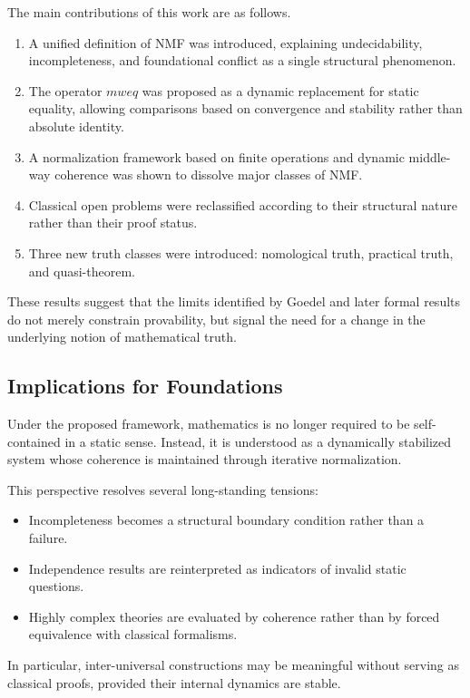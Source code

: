 \documentclass[11pt]{article}
\begin{document}
The main contributions of this work are as follows.

\begin{enumerate}
  \item A unified definition of NMF was introduced, explaining
  undecidability, incompleteness, and foundational conflict as a single
  structural phenomenon.
  \item The operator $mweq$ was proposed as a dynamic replacement for
  static equality, allowing comparisons based on convergence and
  stability rather than absolute identity.
  \item A normalization framework based on finite operations and
  dynamic middle-way coherence was shown to dissolve major classes of
  NMF.
  \item Classical open problems were reclassified according to their
  structural nature rather than their proof status.
  \item Three new truth classes were introduced: nomological truth,
  practical truth, and quasi-theorem.
\end{enumerate}

These results suggest that the limits identified by Goedel and later
formal results do not merely constrain provability, but signal the need
for a change in the underlying notion of mathematical truth.

\subsection{Implications for Foundations}

Under the proposed framework, mathematics is no longer required to be
self-contained in a static sense.
Instead, it is understood as a dynamically stabilized system whose
coherence is maintained through iterative normalization.

This perspective resolves several long-standing tensions:

\begin{itemize}
  \item Incompleteness becomes a structural boundary condition rather
  than a failure.
  \item Independence results are reinterpreted as indicators of invalid
  static questions.
  \item Highly complex theories are evaluated by coherence rather than
  by forced equivalence with classical formalisms.
\end{itemize}

In particular, inter-universal constructions may be meaningful without
serving as classical proofs, provided their internal dynamics are
stable.
\end{document}
